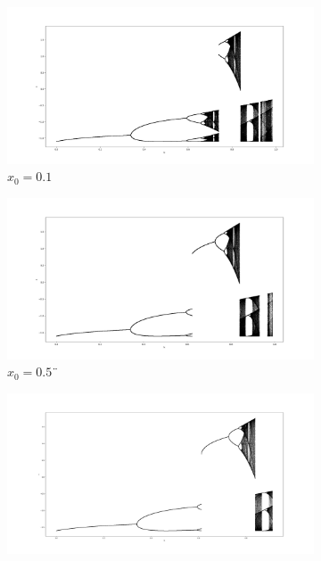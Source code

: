 \begin{figure}[h!]
	\centering
	
	\begin{subfigure}[b]{0.7\textwidth}
		\centering
		\includegraphics[width=\textwidth]{LateX images/graphs q16/g1}
		\caption{\(x_0=0.1\)}
		\label{f:g27}
	\end{subfigure}
	\hfill
	\begin{subfigure}[b]{0.7\textwidth}
		\centering
		\includegraphics[width=\textwidth]{LateX images/graphs q16/g2}
		\caption{\(x_0=0.5\)¨}
		\label{f:g28}
	\end{subfigure}
	\hfill
	\begin{subfigure}[b]{0.7\textwidth}
		\centering
		\includegraphics[width=\textwidth]{LateX images/graphs q16/g3}

\end{subfigure}
\end{figure}
